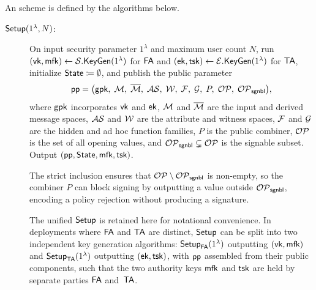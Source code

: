 \begin{definition}[\SMS]\label{definition:SMS-syntax}
An \SMS scheme is defined by the algorithms below.

\begin{description}

\item[$\mathsf{Setup}(1^\lambda, N)$:]
On input security parameter $1^\lambda$ and maximum user count $N$,
run $(\mathsf{vk}, \mathsf{mfk}) \gets \mathcal{S}.\mathsf{KeyGen}(1^\lambda)$ for $\mathsf{FA}$
and $(\mathsf{ek}, \mathsf{tsk}) \gets \mathcal{E}.\mathsf{KeyGen}(1^\lambda)$ for $\mathsf{TA}$,
initialize $\mathsf{State} \coloneqq \emptyset$, and publish the public parameter
\[
\mathsf{pp} = \bigl(\mathsf{gpk},\; \mathcal{M},\; \overline{\mathcal{M}},\; \mathcal{AS},\;
\mathcal{W},\; \mathcal{F},\; \mathcal{G},\; P,\;
\mathcal{OP},\; \mathcal{OP}_\mathsf{sgnbl}\bigr),
\]
where $\mathsf{gpk}$ incorporates $\mathsf{vk}$ and $\mathsf{ek}$,
$\mathcal{M}$ and $\overline{\mathcal{M}}$ are the input and derived message spaces,
$\mathcal{AS}$ and $\mathcal{W}$ are the attribute and witness spaces,
$\mathcal{F}$ and $\mathcal{G}$ are the hidden and ad hoc function families,
$P$ is the public combiner,
$\mathcal{OP}$ is the set of all opening values,
and $\mathcal{OP}_\mathsf{sgnbl} \subsetneq \mathcal{OP}$ is the signable subset.
Output $(\mathsf{pp}, \mathsf{State}, \mathsf{mfk}, \mathsf{tsk})$.

The strict inclusion ensures that $\mathcal{OP} \setminus \mathcal{OP}_\mathsf{sgnbl}$ is non-empty,
so the combiner $P$ can block signing by outputting a value outside $\mathcal{OP}_\mathsf{sgnbl}$,
encoding a policy rejection without producing a signature.

The unified $\mathsf{Setup}$ is retained here for notational convenience.
In deployments where $\mathsf{FA}$ and $\mathsf{TA}$ are distinct,
$\mathsf{Setup}$ can be split into two independent key generation algorithms:
$\mathsf{Setup}_{\mathsf{FA}}(1^\lambda)$ outputting $(\mathsf{vk}, \mathsf{mfk})$
and $\mathsf{Setup}_{\mathsf{TA}}(1^\lambda)$ outputting $(\mathsf{ek}, \mathsf{tsk})$,
with $\mathsf{pp}$ assembled from their public components,
such that the two authority keys $\mathsf{mfk}$ and $\mathsf{tsk}$ are held by separate parties $\mathsf{FA}$ and~$\mathsf{TA}$.


\end{description}
\end{definition}
